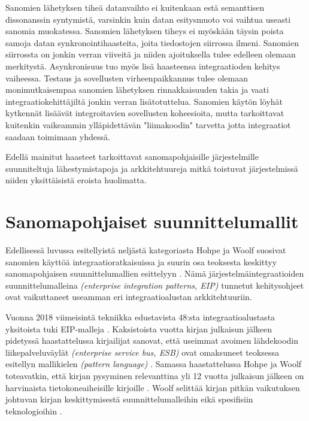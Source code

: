 Sanomien lähetyksen tiheä datanvaihto ei kuitenkaan estä semanttisen dissonanssin syntymistä, varsinkin kuin datan esitysmuoto voi vaihtua useasti sanomia muokatessa.
Sanomien lähetyksen tiheys ei myöskään täysin poista samoja datan synkronointihaasteita, joita tiedostojen siirrossa ilmeni. Sanomien siirrossta on jonkin verran viiveitä ja niiden ajoituksella tulee edelleen olemaan merkitystä.
Asynkronisuus tuo myös lisä haasteensa integraatioden kehitys vaiheessa. Testaus ja sovellusten virheenpaikkannus tulee olemaan monimutkaisempaa sanomien lähetyksen rinnakkaisuuden takia ja vaati integraatiokehittäjiltä jonkin verran lisätotuttelua.
Sanomien käytön löyhät kytkennät lisäävät integroitavien sovellusten koheesioita, mutta tarkoittavat kuitenkin vaikeammin ylläpidettävän "liimakoodin" tarvetta jotta integraatiot saadaan toimimaan yhdessä.

Edellä mainitut haasteet tarkoittavat sanomapohjaisille järjestelmille suunniteltuja lähestymistapoja ja arkkitehtuureja mitkä toistuvat järjestelmissä niiden yksittäisistä eroista huolimatta.

\chapter{Sanomapohjaiset suunnittelumallit}

Edellisessä luvussa esitellyistä neljästä kategoriasta Hohpe ja Woolf suosivat sanomien käyttöä integraatioratkaisuissa ja suurin osa teoksesta keskittyy sanomapohjaisen suunnittelumallien esittelyyn \citep[sivu~76]{Hohpe2004}. Nämä järjestelmäintegraatioiden suunnittelumalleina \textit{(enterprise integration patterns, EIP)} tunnetut kehitysohjeet ovat vaikuttaneet useamman eri integraatioalustan arkkitehtuuriin. 

Vuonna 2018 viimeisintä tekniikka edustavista 48:sta integraatioalustasta yksitoista tuki EIP-malleja \citep{Freire2019}.
Kaksistoista vuotta kirjan julkaisun jälkeen pidetyssä haastattelussa kirjailijat sanovat, että useimmat avoimen lähdekoodin liikepalveluväylät \textit{(enterprise service bus, ESB)} ovat omaksuneet teoksessa esitellyn mallikielen \textit{(pattern language)} \citep{Zimmermann2016}.
Samassa haastattelussa Hohpe ja Woolf toteavatkin, että kirjan pysyminen relevanttina yli 12 vuotta julkaisun jälkeen on harvinaista tietokoneaiheisille kirjoille \citep{Zimmermann2016}. Woolf selittää kirjan pitkän vaikutuksen johtuvan kirjan keskittymisestä suunnittelumalleihin eikä spesifisiin teknologioihin \citep{Zimmermann2016}.


